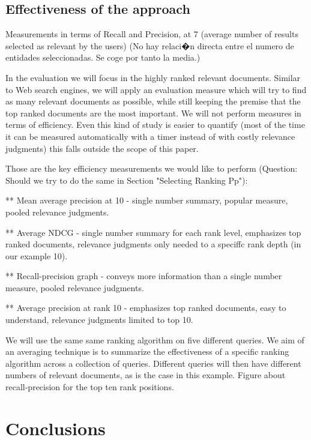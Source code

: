 \documentclass{llncs}
\begin{document}
\subsection{Effectiveness of the approach}
 
Measurements in terms of Recall and Precision, at 7 (average number of results selected as relevant by the users)
 (No hay relaci�n directa entre el numero de entidades seleccionadas. Se coge por tanto la media.)
 
In the evaluation we will focus in the highly ranked relevant documents. Similar to Web search engines, we will apply an evaluation measure which will try to find as many relevant documents as possible, while still keeping the  premise that the top ranked documents are the most important. We will not perform measures in terms of efficiency. Even this kind of study is easier to quantify (most of the time it can be measured automatically with a timer instead of with costly relevance judgments) this falls outside the scope of this paper. 

Those are the key efficiency measurements we would like to perform (Question: Should we try to do the same in Section "Selecting Ranking Pp"):

** Mean average precision at 10  - single number summary, popular measure, pooled
relevance judgments.

** Average NDCG - single number summary for each rank level, emphasizes top ranked documents, relevance judgments only needed to a speciffc rank depth
(in our example 10).

** Recall-precision graph - conveys more information than a single number measure, pooled relevance judgments.

** Average precision at rank 10 - emphasizes top ranked documents, easy to understand, relevance judgments limited to top 10.

We will use the same same ranking algorithm on five different queries. We aim of an averaging technique is to summarize the effectiveness of a specific ranking algorithm across a collection of queries. Different queries will then have different numbers of relevant documents, as is the case in this example. Figure about recall-precision for the top ten rank positions.


\section{Conclusions}
\label{sec:conclusions}
\end{document}
